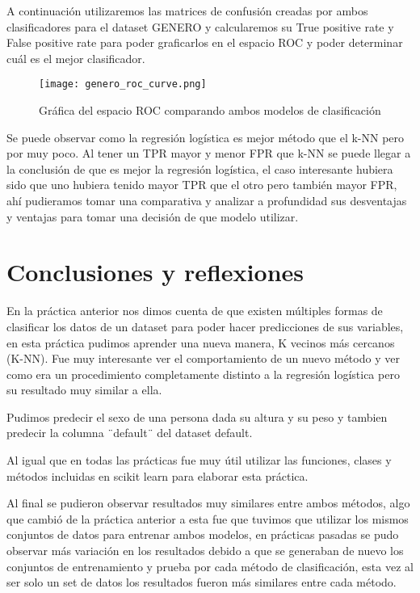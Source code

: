 \documentclass[sigconf,authorversion,nonacm]{acmart}
\begin{document}
A continuación utilizaremos las matrices de confusión creadas por ambos clasificadores para el dataset GENERO y calcularemos su True positive rate y False positive rate para poder graficarlos en el espacio ROC y poder determinar cuál es el mejor clasificador.

\begin{figure}[H]
  \centering
  \texttt{[image: genero\_roc\_curve.png]}
  \caption{Gráfica del espacio ROC comparando ambos modelos de clasificación}
\end{figure}

Se puede observar como la regresión logística es mejor método que el k-NN pero por muy poco. Al tener un TPR mayor y menor FPR que k-NN se puede llegar a la conclusión de que es mejor la regresión logística, el caso interesante hubiera sido que uno hubiera tenido mayor TPR que el otro pero también mayor FPR, ahí pudieramos tomar una comparativa y analizar a profundidad sus desventajas y ventajas para tomar una decisión de que modelo utilizar.


\section{Conclusiones y reflexiones}
En la práctica anterior nos dimos cuenta de que existen múltiples formas de clasificar los datos de un dataset para poder hacer predicciones de sus variables, en esta práctica pudimos aprender una nueva manera, K vecinos más cercanos (K-NN). Fue muy interesante ver el comportamiento de un nuevo método y ver como era un procedimiento completamente distinto a la regresión logística pero su resultado muy similar a ella.

Pudimos predecir el sexo de una persona dada su altura y su peso y tambien predecir la columna ¨default¨ del dataset default.

Al igual que en todas las prácticas fue muy útil utilizar las funciones, clases y métodos incluidas en scikit learn para elaborar esta práctica.


Al final se pudieron observar resultados muy similares entre ambos métodos, algo que cambió de la práctica anterior a esta fue que tuvimos que utilizar los mismos conjuntos de datos para entrenar ambos modelos, en prácticas pasadas se pudo observar más variación en los resultados debido a que se generaban de nuevo los conjuntos de entrenamiento y prueba por cada método de clasificación, esta vez al ser solo un set de datos los resultados fueron más similares entre cada método.
\end{document}
